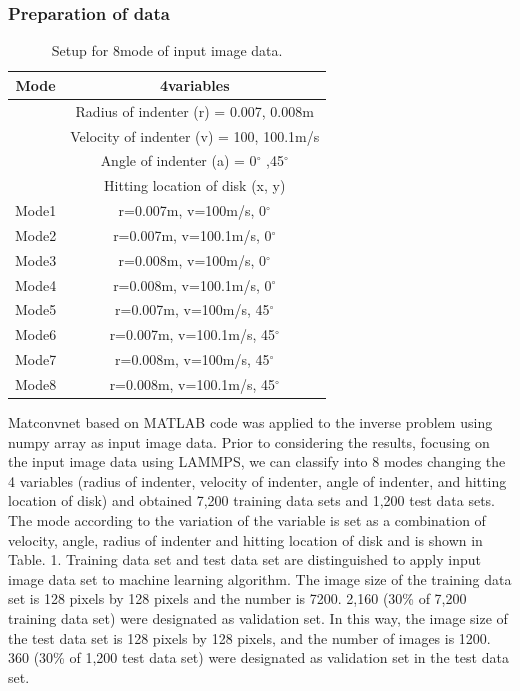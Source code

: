 \subsubsection{Preparation of data}
\label{subsubsec1}
\begin{table}[h!]
\centering
\caption{Setup for 8mode of input image data.}
\label{tab:1}       
\begin{tabular}{c|c}
\hline
\hline
Mode & 4variables \\
\hline
 & Radius of indenter (r) = 0.007, 0.008m \\
 & Velocity of indenter (v) = 100, 100.1m/s \\
 & Angle of indenter (a) = 0$^{\circ}$ ,45$^{\circ}$  \\
 & Hitting location of disk (x, y) \\
 \hline
Mode1 & r=0.007m, v=100m/s, 0$^{\circ}$ \\
Mode2 & r=0.007m, v=100.1m/s, 0$^{\circ}$ \\
Mode3 & r=0.008m, v=100m/s, 0$^{\circ}$ \\
Mode4 & r=0.008m, v=100.1m/s, 0$^{\circ}$ \\
Mode5 & r=0.007m, v=100m/s, 45$^{\circ}$ \\
Mode6 & r=0.007m, v=100.1m/s, 45$^{\circ}$ \\
Mode7 & r=0.008m, v=100m/s, 45$^{\circ}$ \\
Mode8 & r=0.008m, v=100.1m/s, 45$^{\circ}$ \\
\hline
\end{tabular}
\end{table}
Matconvnet \cite{Ref19} based on MATLAB code was applied to the inverse problem using numpy array as input image data. Prior to considering the results, focusing on the input image data using LAMMPS, we can classify into 8 modes changing the 4 variables (radius of indenter, velocity of indenter, angle of indenter, and hitting location of disk) and obtained 7,200 training data sets and 1,200 test data sets. The mode according to the variation of the variable is set as a combination of velocity, angle, radius of indenter and hitting location of disk and is shown in Table. 1. Training data set and test data set are distinguished to apply input image data set to machine learning algorithm. The image size of the training data set is 128 pixels by 128 pixels and the number is 7200. 2,160 (30\% of 7,200 training data set) were designated as validation set. In this way, the image size of the test data set is 128 pixels by 128 pixels, and the number of images is 1200. 360 (30\% of 1,200 test data set) were designated as validation set in the test data set.
